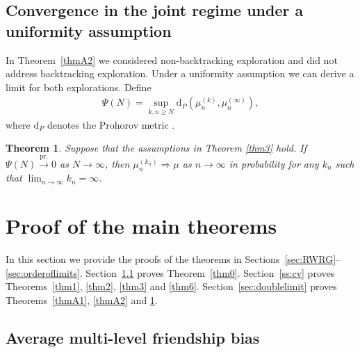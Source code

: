 \documentclass[11pt]{article}
\numberwithin{equation}{section}
\theoremstyle{plain}
\newtheorem{theorem}{Theorem}[section]
\newcommand{\prob}{\overset{\mathrm{pr.}}{\longrightarrow}}
\newcommand{\weak}{\Longrightarrow}
\begin{document}

\subsection{Convergence in the joint regime under a uniformity assumption}

In Theorem~\ref{thmA2} we considered non-backtracking exploration and did not address backtracking exploration. Under a uniformity assumption we can derive a limit for both explorations. Define
\begin{align*}
\Psi(N)=\sup_{k,n\geq N}\mathrm{d}_{P}(\mu_{n}^{(k)},\mu_{n}^{(\infty)}),
\end{align*}
where $\mathrm{d}_{P}$ denotes the Prohorov metric \cite[Section 6]{Billingsley}.

\begin{theorem} 
\label{thm4}
Suppose that the assumptions in Theorem \ref{thm3} hold. If $\Psi(N)\prob 0$ as $N\to\infty$, then $\mu_{n}^{(k_n)} \weak \mu$ as $n\to\infty$ in probability for any $k_n$ such that $\lim_{n\to\infty} k_n = \infty$.
\end{theorem}




\section{Proof of the main theorems}
\label{sec:proofs}

In this section we provide the proofs of the theorems in Sections~\ref{sec:RWRG}--\ref{sec:orderoflimits}. Section~\ref{ss:amlfb} proves Theorem~\ref{thm0}. Section~\ref{ss:cv} proves Theorems~\ref{thm1}, \ref{thm2}, \ref{thm3} and \ref{thm6}. Section~\ref{sec:doublelimit} proves Theorems~\ref{thmA1}, \ref{thmA2} and \ref{thm4}. 


\subsection{Average multi-level friendship bias}
\label{ss:amlfb}
\end{document}
